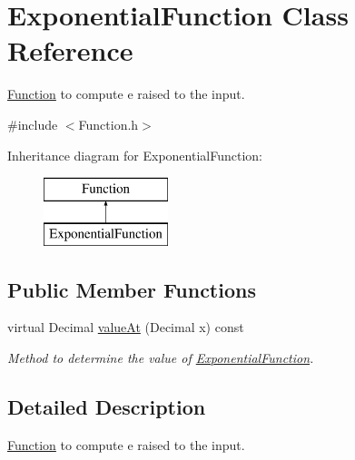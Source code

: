 \hypertarget{class_exponential_function}{\section{Exponential\+Function Class Reference}
\label{class_exponential_function}
}


\hyperlink{class_function}{Function} to compute e raised to the input.  




{\ttfamily \#include $<$Function.\+h$>$}

Inheritance diagram for Exponential\+Function\+:\begin{figure}[H]
\begin{center}
\leavevmode
\includegraphics[height=2.000000cm]{class_exponential_function}
\end{center}
\end{figure}
\subsection*{Public Member Functions}
\begin{DoxyCompactItemize}
\item 
virtual Decimal \hyperlink{class_exponential_function_acb8ed2181be3fa4082a8ff3a61e711a1}{value\+At} (Decimal x) const 
\begin{DoxyCompactList}\small\item\em Method to determine the value of \hyperlink{class_exponential_function}{Exponential\+Function}. \end{DoxyCompactList}\end{DoxyCompactItemize}


\subsection{Detailed Description}
\hyperlink{class_function}{Function} to compute e raised to the input. 

